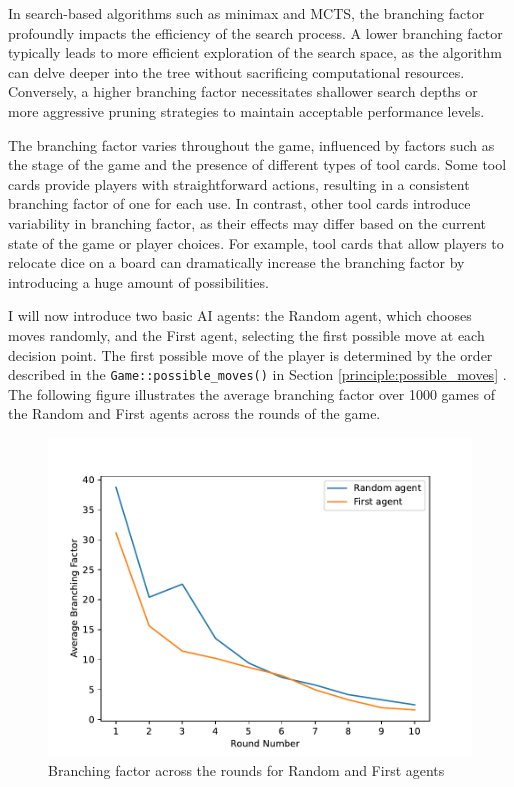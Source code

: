 In search-based algorithms such as minimax and MCTS, the branching factor profoundly impacts the efficiency of the search process. A lower branching factor 
typically leads to more efficient exploration of the search space, as the algorithm can delve deeper into the tree without sacrificing computational resources. 
Conversely, a higher branching factor necessitates shallower search depths or more aggressive pruning strategies to maintain acceptable performance levels.

The branching factor varies throughout the game, influenced by factors such as the stage of the game and the presence of 
different types of tool cards. Some tool cards provide players with straightforward actions, resulting in a consistent 
branching factor of one for each use. In contrast, other tool cards introduce variability in branching factor, as their effects 
may differ based on the current state of the game or player choices. For example, tool cards that allow players to relocate dice 
on a board can dramatically increase the branching factor by introducing a huge amount of possibilities.

I will now introduce two basic AI agents: the Random agent, which chooses moves randomly, and the First agent, selecting the first possible move at each decision point.
The first possible move of the player is determined by the order described in the \texttt{Game::possible\_moves()} in Section \ref{principle:possible_moves} .
The following figure illustrates the average branching factor over 1000 games of the Random and First agents across the rounds of the game.


\begin{figure}[H]
    \caption{ Branching factor across the rounds for Random and First agents}
    \centerline{\mbox{\includegraphics[width=150mm]{img/random_agents_branching_factor.pdf}}}
    \label{fig:example}
\end{figure}


